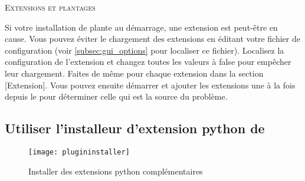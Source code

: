 \begin{Tip}\caption{\textsc{Extensions et plantages}}
Si votre installation de \qg plante au démarrage, une extension est peut-être 
en cause. Vous pouvez éviter le chargement des extensions en éditant votre 
fichier de configuration (voir \ref{subsec:gui_options} pour localiser ce fichier). 
Localisez la configuration de l'extension et changez toutes les valeurs à false 
pour empêcher leur chargement. 
 Faites de même pour chaque extension dans la section [Extension]. Vous pouvez ensuite 
démarrer \qg et ajouter les extensions une à la fois depuis le  
pour déterminer celle qui est la source du problème.
\end{Tip}

\subsection{Utiliser l'installeur d'extension python de \qg}\label{sec:python_plugin_installer}

\begin{figure}[ht]
   \begin{center}
   \texttt{[image: plugininstaller]}
   \caption{Installer des extensions python complémentaires\nixcaption}
\label{fig:plugininstaller}
\end{center}
\end{figure}

